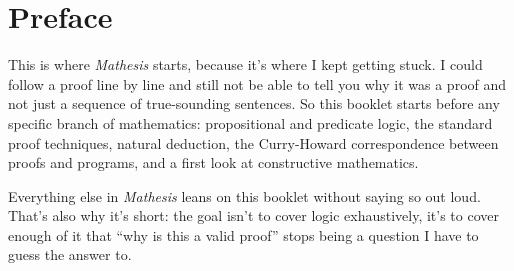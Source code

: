 \chapter*{Preface}

This is where \textit{Mathesis} starts, because it's where I kept
getting stuck. I could follow a proof line by line and still not be able
to tell you why it was a proof and not just a sequence of true-sounding
sentences. So this booklet starts before any specific branch of
mathematics: propositional and predicate logic, the standard proof
techniques, natural deduction, the Curry-Howard correspondence between
proofs and programs, and a first look at constructive mathematics.

Everything else in \textit{Mathesis} leans on this booklet without
saying so out loud. That's also why it's short: the goal isn't to cover
logic exhaustively, it's to cover enough of it that ``why is this a
valid proof'' stops being a question I have to guess the answer to.
